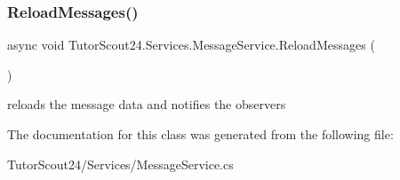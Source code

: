 \subsubsection{\texorpdfstring{Reload\+Messages()}{ReloadMessages()}}
{\footnotesize\ttfamily async void Tutor\+Scout24.\+Services.\+Message\+Service.\+Reload\+Messages (\begin{DoxyParamCaption}{ }\end{DoxyParamCaption})\hspace{0.3cm}{\ttfamily [inline]}}



reloads the message data and notifies the observers 



The documentation for this class was generated from the following file\+:\begin{DoxyCompactItemize}
\item 
Tutor\+Scout24/\+Services/Message\+Service.\+cs\end{DoxyCompactItemize}

